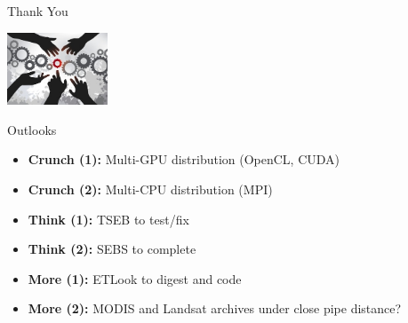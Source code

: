 \documentclass[xcolor=dvipsnames,beamer]{beamer} %
\begin{document}
\begin{frame}[fragile]{Thank You}

\begin{center}
 \includegraphics[width=3cm]{OpenInnovation}
\end{center}

\end{frame}

\begin{frame}[fragile]{Outlooks}

\begin{itemize}
 \item {\bf Crunch (1):} Multi-GPU distribution (OpenCL, CUDA)
 \item {\bf Crunch (2):} Multi-CPU distribution (MPI)
 \item {\bf Think (1):} TSEB to test/fix
 \item {\bf Think (2):} SEBS to complete
 \item {\bf More (1):} ETLook to digest and code
 \item {\bf More (2):} MODIS and Landsat archives under close pipe distance?
\end{itemize}

\end{frame}
\end{document}
